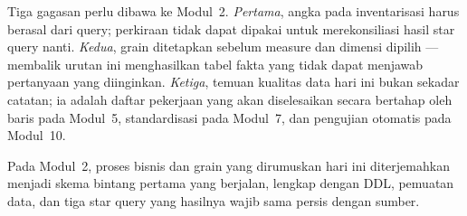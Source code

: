 Tiga gagasan perlu dibawa ke Modul~2. \emph{Pertama}, angka pada inventarisasi
harus berasal dari query; perkiraan tidak dapat dipakai untuk merekonsiliasi
hasil star query nanti. \emph{Kedua}, grain ditetapkan sebelum measure dan
dimensi dipilih --- membalik urutan ini menghasilkan tabel fakta yang tidak
dapat menjawab pertanyaan yang diinginkan. \emph{Ketiga}, temuan kualitas data
hari ini bukan sekadar catatan; ia adalah daftar pekerjaan yang akan
diselesaikan secara bertahap oleh baris  pada Modul~5,
standardisasi pada Modul~7, dan pengujian otomatis pada Modul~10.

Pada Modul~2, proses bisnis dan grain yang dirumuskan hari ini diterjemahkan
menjadi skema bintang pertama yang berjalan, lengkap dengan DDL, pemuatan data,
dan tiga star query yang hasilnya wajib sama persis dengan sumber.
